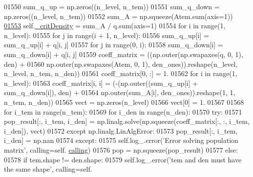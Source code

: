 \begin{DoxyCode}
01550             sum\_q\_up = np.zeros((n\_level, n\_tem))
01551             sum\_q\_down = np.zeros((n\_level, n\_tem))
01552             sum\_A = np.squeeze(Atem.sum(axis=1))
\hypertarget{classpyneb_1_1core_1_1pynebcore_1_1_atom_l01553}{}\hyperlink{classpyneb_1_1core_1_1pynebcore_1_1_atom_a1d0823a36ca030fd149522fe72908631}{01553}             self.\hyperlink{classpyneb_1_1core_1_1pynebcore_1_1_atom_a1d0823a36ca030fd149522fe72908631}{\_critDensity} = sum\_A / q.sum(axis=1)
01554             \textcolor{keywordflow}{for} i \textcolor{keywordflow}{in} range(1, n\_level):
01555                 \textcolor{keywordflow}{for} j \textcolor{keywordflow}{in} range(i + 1, n\_level):
01556                     sum\_q\_up[i] = sum\_q\_up[i] + q[i, j]
01557                 \textcolor{keywordflow}{for} j \textcolor{keywordflow}{in} range(0, i):
01558                     sum\_q\_down[i] = sum\_q\_down[i] + q[i, j]
01559             coeff\_matrix = ((np.outer(np.swapaxes(q, 0, 1), den) + 
01560                              np.outer(np.swapaxes(Atem, 0, 1), den\_ones)).reshape(n\_level, n\_level, n\_tem, 
      n\_den))
01561             coeff\_matrix[0, :] = 1.
01562             \textcolor{keywordflow}{for} i \textcolor{keywordflow}{in} range(1, n\_level):
01563                 coeff\_matrix[i, i] = (-(np.outer((sum\_q\_up[i] + sum\_q\_down[i]), den) + 
01564                                         np.outer(sum\_A[i], den\_ones)).reshape(1, 1, n\_tem, n\_den))
01565             vect = np.zeros(n\_level)
01566             vect[0] = 1.
01567     
01568             \textcolor{keywordflow}{for} i\_tem \textcolor{keywordflow}{in} range(n\_tem):
01569                 \textcolor{keywordflow}{for} i\_den \textcolor{keywordflow}{in} range(n\_den):
01570                     \textcolor{keywordflow}{try}:
01571                         pop\_result[:, i\_tem, i\_den] = np.linalg.solve(np.squeeze(coeff\_matrix[:, :, i\_tem, 
      i\_den]), vect)
01572                     \textcolor{keywordflow}{except} np.linalg.LinAlgError:
01573                         pop\_result[:, i\_tem, i\_den] = np.nan
01574                     \textcolor{keywordflow}{except}:
01575                         self.log\_.error(\textcolor{stringliteral}{'Error solving population matrix'}, calling=self.
      \hyperlink{classpyneb_1_1core_1_1pynebcore_1_1_atom_a373b7735acf4f528b54bddf373ad67a1}{calling})
01576             pop = np.squeeze(pop\_result)
01577         \textcolor{keywordflow}{else}:
01578             \textcolor{keywordflow}{if} tem.shape != den.shape:
01579                 self.log\_.error(\textcolor{stringliteral}{'tem and den must have the same shape'}, calling=self.

\end{DoxyCode}
